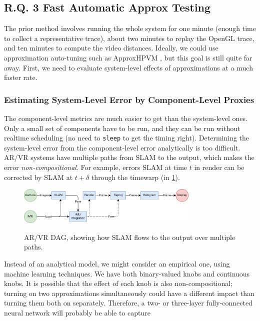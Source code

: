 \subsection{R.Q. 3 Fast Automatic Approx Testing}

The prior method involves running the whole system for one minute (enough time to collect a representative trace), about two minutes to replay the OpenGL trace, and ten minutes to compute the video distances. Ideally, we could use approximation auto-tuning such as ApproxHPVM \cite{approxhpvm}, but this goal is still quite far away. First, we need to evaluate system-level effects of approximations at a much faster rate.

\subsubsection{Estimating System-Level Error by Component-Level Proxies}

The component-level metrics are much easier to get than the system-level ones. Only a small set of components have to be run, and they can be run without realtime scheduling (no need to \verb+sleep+ to get the timing right). Determining the system-level error from the component-level error analytically is too difficult. AR/VR systems have multiple paths from SLAM to the output, which makes the error \textit{non-compositional}. For example, errors SLAM at time \(t\) in render can be corrected by SLAM at \(t+\delta\) through the timewarp (in \cref{dag}).

\begin{figure}
\caption{AR/VR DAG, showing how SLAM flows to the output over multiple paths.}
\includegraphics[height=1.8cm]{dag.png}
\label{dag}
\end{figure}

Instead of an analytical model, we might consider an empirical one, using machine learning techniques. We have both binary-valued knobs and continuous knobs. It is possible that the effect of each knob is also non-compositional; turning on two approximations simultaneously could have a different impact than turning them both on separately. Therefore, a two- or three-layer fully-connected neural network will probably be able to capture 

